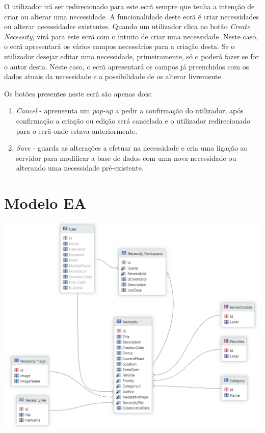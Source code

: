 \documentclass[a4paper,openright,12pt]{report}
\begin{document}
O utilizador irá ser redirecionado para este ecrã sempre que tenha a intenção de criar ou alterar uma necessidade.
A funcionalidade deste ecrã é criar necessidades ou alterar necessidades existentes.
Quando um utilizador clica no botão \textit{Create Necessity}, virá para este ecrã com o intuito de criar uma necessidade.
Neste caso, o ecrã apresentará os vários campos necessários para a criação desta.
Se o utilizador desejar editar uma necessidade, primeiramente, só o poderá fazer se for o autor desta.
Neste caso, o ecrã apresentará os campos já preenchidos com os dados atuais da necessidade e a possibilidade de os alterar livremente.

Os botões presentes neste ecrã são apenas dois:
\begin{enumerate}
    \item \textit{Cancel} - aprensenta um \textit{pop-up} a pedir a confirmação do utilizador, após confirmação a criação ou edição será cancelada e o utilizador redirecionado para o ecrã onde estava anteriormente.
    \item \textit{Save} - guarda as alterações a efetuar na necessidade e cria uma ligação ao servidor para modificar a base de dados com uma nova necessidade ou alterando uma necessidade pré-existente.
\end{enumerate}

\section{Modelo EA}\label{sec:db}


\includegraphics[scale=0.5]{figures/DataModel.png}
\end{document}

